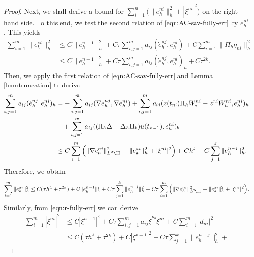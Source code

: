 \begin{proof}
Next, we shall derive a bound for  $ \sum_{i=1}^m \Big(\|  e_h^{ni} \|_h^2+ |\xi^{ni}|^2 \Big)$
 on the right-hand side. To this
end, we test the second relation of \eqref{eqn:AC-sav-fully-err} by $e_h^{ni}$. This yields
\begin{equation*}
\begin{split}
 \sum_{i=1}^m \|e_h^{ni}\|_h^2 & \le C \|  e_h^{n-1} \|_h^2 + C\tau\sum_{i,j=1}^m a_{ij}(\dot e_h^{nj},e_h^{ni}) + C\sum_{i=1}^m \| \Pi_h \eta_{ni} \|_h^2\\
& \le  C \|  e_h^{n-1} \|_h^2 + C\tau\sum_{i,j=1}^m a_{ij}(\dot e_h^{nj},e_h^{ni}) _h + C\tau^{2k}.
\end{split}
\end{equation*}
Then, we apply the first relation of  \eqref{eqn:AC-sav-fully-err} and Lemma \ref{lem:truncation} to derive
\begin{equation*}
\begin{split}
 \sum_{i,j=1}^m a_{ij}(\dot e_h^{nj},e_h^{ni})_h &= - \sum_{i,j=1}^m a_{ij}(\nabla e_h^{nj}, \nabla e_h^{ni})
 + \sum_{i,j=1}^m a_{ij}   (z(t_{ni}) \Pi_h W_*^{ni} - z^{ni} W_h^{ni}, e_h^{ni})_h\\
&\quad + \sum_{i,j=1}^m a_{ij}  ((\Pi_h \Delta - \Delta_h \Pi_h) u(t_{n-1}),  e_h^{ni} )_h \\
&\le C\sum_{i=1}^m \Big(\| \nabla e_h^{ni}  \|_{L^2\II}^2 + \|  e_h^{ni}  \|_{h}^2 + |\xi^{ni}|^2 \Big)+ Ch^4 + C\sum_{j=1}^k \| e_h^{n-j} \|_h^2.
\end{split}
\end{equation*}
Therefore, we obtain
\begin{equation*}
\begin{split}
 \sum_{i=1}^m \|e_h^{ni}\|_h^2   \le  C( \tau h^4+\tau^{2k}) + C\|  e_h^{n-1} \|_h^2 + C\tau \sum_{j=1}^k \| e_h^{n-j} \|_h^2 +
 C\tau \sum_{i=1}^m \Big(\| \nabla e_h^{ni}  \|_{L^2\II}^2 + \|  e_h^{ni}  \|_{h}^2 + |\xi^{ni}|^2 \Big).
\end{split}
\end{equation*}
Similarly, from \eqref{eqn:r-fully-err} we can derive
\begin{equation*}
\begin{split}
 \sum_{i=1}^m |\xi^{ni}|^2 & \le C |\xi^{n-1}|^2 + C\tau\sum_{i,j=1}^m a_{ij} \dot \xi^{nj} \xi^{ni} + C\sum_{i=1}^m |d_{ni}|^2\\
&\le C(\tau h^4 + \tau^{2k})+C|\xi^{n-1}|^2  + C\tau \sum_{j=1}^k \| e_h^{n-j} \|_h^2 +

\end{split}
\end{equation*}
\end{proof}
